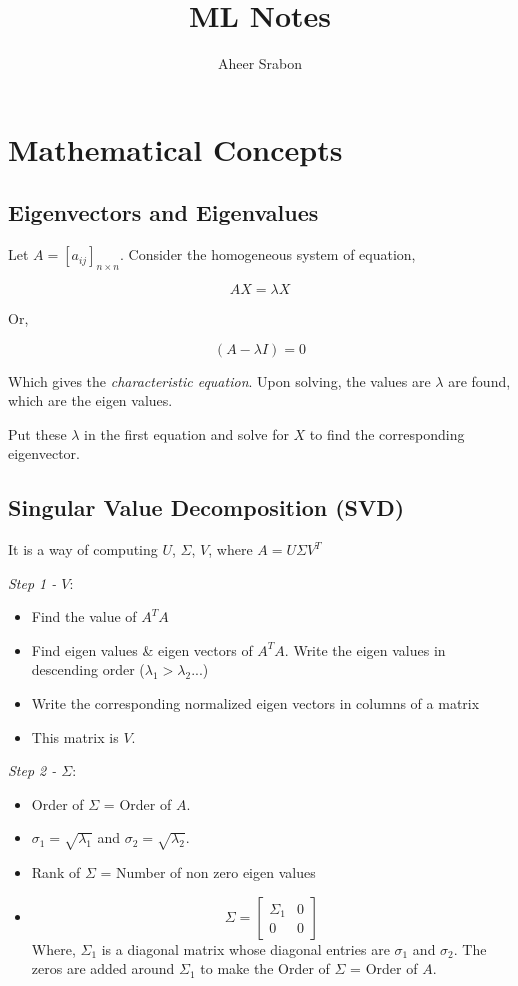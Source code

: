 
\title{ML Notes}
\author{Aheer Srabon}


\maketitle

\section{Mathematical Concepts}

\subsection{Eigenvectors and Eigenvalues}
Let $A = [a_{ij}]_{n \times n}$. Consider the homogeneous
system of equation,

\[
    AX = \lambda X
\]

Or,

\[
    (A - \lambda I) = 0
\]

Which gives the \emph{characteristic equation}. Upon solving,
the values are $\lambda$ are found, which are the eigen values.

Put these $\lambda$ in the first equation and solve for $X$
to find the corresponding eigenvector.

\subsection{Singular Value Decomposition (SVD)}
It is a way of computing $U$, $\Sigma$, $V$, where $A = U\Sigma V^{T}$

\emph{Step 1 - $V$}:
\begin{itemize}
    \item Find the value of $A^TA$
    \item Find eigen values \& eigen vectors of $A^TA$.
        Write the eigen values in descending order
        ($\lambda_1 > \lambda_2 ...$) 
    \item Write the corresponding normalized eigen vectors
        in columns of a matrix
    \item This matrix is $V$.
\end{itemize}

\emph{Step 2 - $\Sigma$}:
\begin{itemize}
    \item Order of $\Sigma$ = Order of $A$.
    \item $\sigma_1 = \sqrt{\lambda_1}$ and $\sigma_2 = \sqrt{\lambda_2}$.
    \item Rank of $\Sigma$ = Number of non zero eigen values
    \item
        \[
            \Sigma =
                \begin{bmatrix}
                    \Sigma_1 & 0 \\
                    0 & 0
                \end{bmatrix}
        \]
        Where, $\Sigma_1$ is a diagonal matrix whose diagonal entries are
        $\sigma_1$ and $\sigma_2$. The zeros are added around $\Sigma_1$
        to make the Order of $\Sigma$ = Order of $A$.

\end{itemize}

